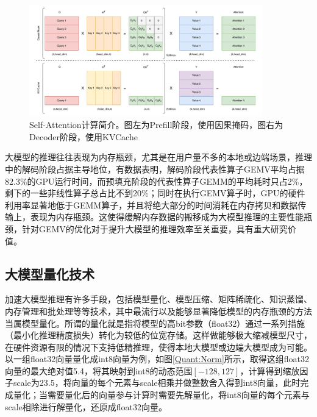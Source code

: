 \begin{figure}[!htbp]
	\centering
    \includegraphics[width=0.9\textwidth]{figures/KVCache.pdf}
    \caption{Self-Attention计算简介。图左为Prefill阶段，使用因果掩码，图右为Decoder阶段，使用KVCache}
	\label{KVCache}
\end{figure}

大模型的推理往往表现为内存瓶颈，尤其是在用户量不多的本地或边端场景，推理中的解码阶段占据主导地位，有数据表明，解码阶段代表性算子GEMV平均占据82.3\%的GPU运行时间，而预填充阶段的代表性算子GEMM的平均耗时只占2\%，剩下的一些非线性算子总占比不到20\%；同时在执行GEMV算子时，GPU的硬件利用率显著地低于GEMM算子，并且将绝大部分的时间消耗在内存拷贝和数据传输上，表现为内存瓶颈\cite{SamsungHotChips}。这使得缓解内存数据的搬移成为大模型推理的主要性能瓶颈，针对GEMV的优化对于提升大模型的推理效率至关重要，具有重大研究价值。

\subsection{大模型量化技术}
加速大模型推理有许多手段，包括模型量化、模型压缩、矩阵稀疏化、知识蒸馏、内存管理和批处理等等技术\cite{LLMInferSurveyTsingHua}，其中最流行以及能够显著降低模型的内存瓶颈的方法当属模型量化。所谓的量化就是指将模型的高bit参数（float32）通过一系列措施（最小化推理精度损失）转化为较低的位宽存储。这样做能够极大缩减模型尺寸，在硬件资源有限的情况下支持低精推理，使得本地大模型或边端大模型成为可能。以一组float32向量量化成int8向量为例，如图\ref{Quant:Norm}所示，取得这组float32向量的最大绝对值5.4，将其映射到int8的动态范围$[-128,127]$，计算得到缩放因子scale为23.5，将向量的每个元素与scale相乘并做整数舍入得到int8向量，此时完成量化；当需要量化后的向量参与计算时需要先解量化，将int8向量的每个元素与scale相除进行解量化，还原成float32向量。

